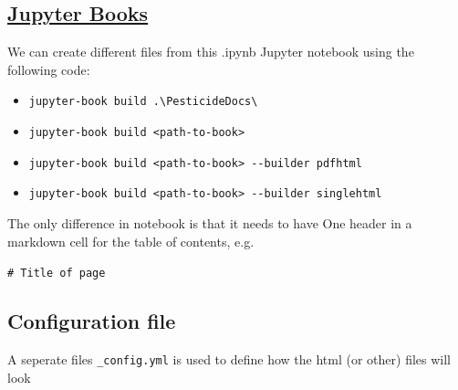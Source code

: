 \documentclass[
  letterpaper,
  DIV=11,
  numbers=noendperiod]{scrartcl}
\providecommand{\tightlist}{%
  \setlength{\itemsep}{0pt}\setlength{\parskip}{0pt}}\usepackage{longtable,booktabs,array}
\begin{document}
\hypertarget{jupyter-books}{%
\subsection{\texorpdfstring{\href{https://jupyterbook.org/en/stable/basics/build.html}{Jupyter
Books}}{Jupyter Books}}\label{jupyter-books}}

We can create different files from this .ipynb Jupyter notebook using
the following code:

\begin{itemize}
\tightlist
\item
  \texttt{jupyter-book\ build\ .\textbackslash{}PesticideDocs\textbackslash{}}
\item
  \texttt{jupyter-book\ build\ \textless{}path-to-book\textgreater{}}
\item
  \texttt{jupyter-book\ build\ \textless{}path-to-book\textgreater{}\ -\/-builder\ pdfhtml}
\item
  \texttt{jupyter-book\ build\ \textless{}path-to-book\textgreater{}\ -\/-builder\ singlehtml}
\end{itemize}

The only difference in notebook is that it needs to have One header in a
markdown cell for the table of contents, e.g.~

\texttt{\#\ Title\ of\ page}

\hypertarget{configuration-file}{%
\subsection{Configuration file}\label{configuration-file}}

A seperate files \texttt{\_config.yml} is used to define how the html
(or other) files will look
\end{document}
